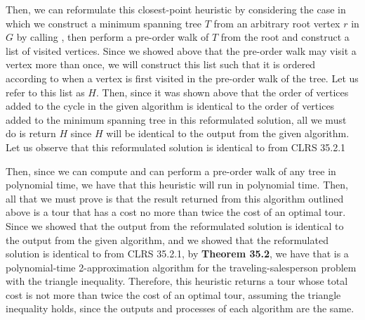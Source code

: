 \documentclass[11pt]{article}
\begin{document}
Then, we can reformulate this closest-point heuristic by considering the case in which we construct a minimum spanning tree $T$ from an arbitrary root vertex $r$ in $G$ by calling , then perform a pre-order walk of $T$ from the root and construct a list of visited vertices. Since we showed above that the pre-order walk may visit a vertex more than once, we will construct this list such that it is ordered according to when a vertex is first visited in the pre-order walk of the tree. Let us refer to this list as $H$. Then, since it was shown above that the order of vertices added to the cycle in the given algorithm is identical to the order of vertices added to the minimum spanning tree in this reformulated solution, all we must do is return $H$ since $H$ will be identical to the output from the given algorithm. Let us observe that this reformulated solution is identical to  from CLRS 35.2.1

Then, since we can compute  and can perform a pre-order walk of any tree in polynomial time, we have that this heuristic will run in polynomial time. Then, all that we must prove is that the result returned from this algorithm outlined above is a tour that has a cost no more than twice the cost of an optimal tour. Since we showed that the output from the reformulated solution is identical to the output from the given algorithm, and we showed that the reformulated solution is identical to  from CLRS 35.2.1, by \textbf{Theorem 35.2}, we have that  is a polynomial-time 2-approximation algorithm for the traveling-salesperson problem with the triangle inequality. Therefore, this heuristic returns a tour whose total cost is not more than twice the cost of an optimal tour, assuming the triangle inequality holds, since the outputs and processes of each algorithm are the same.

\newpage
\end{document}
